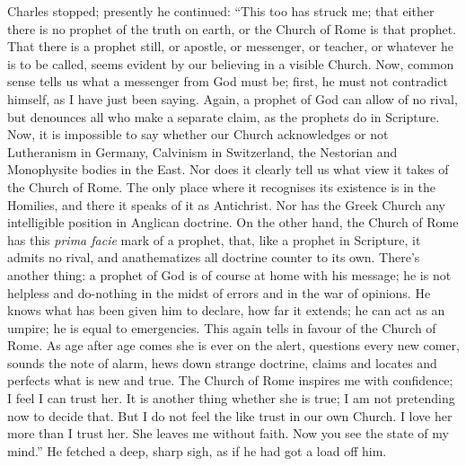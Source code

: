 Charles stopped; presently he continued: ``This too has struck
me; that either there is no prophet of the truth on earth, or
the Church of Rome is that prophet. That there is a prophet still, or
apostle, or messenger, or teacher, or whatever he is to be called,
seems evident by our believing in a visible Church. Now, common sense
tells us what a messenger from God must be; first, he must not
contradict himself, as I have just been saying. Again, a prophet of
God can allow of no rival, but denounces all who make a separate
claim, as the prophets do in Scripture. Now, it is impossible to say
whether our Church acknowledges or not Lutheranism in Germany,
Calvinism in Switzerland, the Nestorian and Monophysite bodies in the
East. Nor does it clearly tell us what view it takes of the Church of
Rome. The only place where it recognises its existence is in the
Homilies, and there it speaks of it as Antichrist. Nor has the Greek
Church any intelligible position in Anglican doctrine. On the other
hand, the Church of Rome has this \emph{prima facie} mark of a
prophet, that, like a prophet in Scripture, it admits no rival, and
anathematizes all doctrine counter to its own. There's another thing: a
prophet of God is of course at home with his message; he is not
helpless and do-nothing in the midst of errors and in the war of
opinions. He knows what has been given him to declare, how far it
extends; he can act as an umpire; he is equal to emergencies. This
again tells in favour of the Church of Rome. As age after age comes
she is ever on the alert, questions every new comer, sounds the note
of alarm, hews down strange doctrine, claims and locates and perfects
what is new and true. The Church of Rome inspires me with confidence;
I feel I can trust her. It is another thing whether she is true;
I am not pretending now to decide that. But I do not feel the like
trust in our own Church. I love her more than I trust her. She leaves
me without faith. Now you see the state of my mind.'' He fetched a
deep, sharp sigh, as if he had got a load off him.

